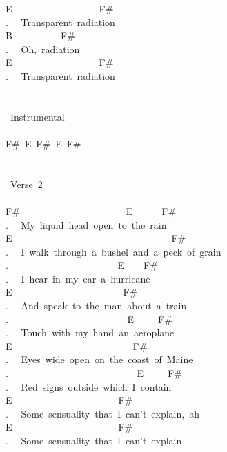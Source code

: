 {E\ \ \ \ \ \ \ \ \ \ \ \ \ \ \ \ \ \ F\#\\
. \ \ Transparent\ radiation\\
B\ \ \ \ \ \ \ \ \ \ F\#\\
. \ \ Oh,\ radiation\\
E\ \ \ \ \ \ \ \ \ \ \ \ \ \ \ \ \ \ F\#\\
. \ \ Transparent\ radiation\\
\\
\\
\lbrack\ Instrumental\rbrack\\
\\
F\#\ E\ F\#\ E\ F\#\\
\\
\\
\lbrack\ Verse\ 2\rbrack\\
\\
F\#\ \ \ \ \ \ \ \ \ \ \ \ \ \ \ \ \ \ \ \ \ \ E\ \ \ \ \ \ F\#\\
. \ \ My\ liquid\ head\ open\ to\ the\ rain\\
E\ \ \ \ \ \ \ \ \ \ \ \ \ \ \ \ \ \ \ \ \ \ \ \ \ \ \ \ \ \ \ \ \ F\#\\
. \ \ I\ walk\ through\ a\ bushel\ and\ a\ peck\ of\ grain\\
. \ \ \ \ \ \ \ \ \ \ \ \ \ \ \ \ \ \ \ \ \ \ E\ \ \ \ F\#\\
. \ \ I\ hear\ in\ my\ ear\ a\ hurricane\\
E\ \ \ \ \ \ \ \ \ \ \ \ \ \ \ \ \ \ \ \ \ \ \ F\#\ \\
. \ \ And\ speak\ to\ the\ man\ about\ a\ train\\
. \ \ \ \ \ \ \ \ \ \ \ \ \ \ \ \ \ \ \ \ \ \ \ \ E\ \ \ \ \ F\#\\
. \ \ Touch\ with\ my\ hand\ an\ aeroplane\\
E\ \ \ \ \ \ \ \ \ \ \ \ \ \ \ \ \ \ \ \ \ \ \ \ \ F\#\\
. \ \ Eyes\ wide\ open\ on\ the\ coast\ of\ Maine\\
. \ \ \ \ \ \ \ \ \ \ \ \ \ \ \ \ \ \ \ \ \ \ \ \ \ \ E\ \ \ \ \ F\#\\
. \ \ Red\ signs\ outside\ which\ I\ contain\\
E\ \ \ \ \ \ \ \ \ \ \ \ \ \ \ \ \ \ \ \ \ \ F\#\ \\
. \ \ Some\ sensuality\ that\ I\ can't\ explain,\ ah\\
E\ \ \ \ \ \ \ \ \ \ \ \ \ \ \ \ \ \ \ \ \ \ F\#\ \\
. \ \ Some\ sensuality\ that\ I\ can't\ explain\\
}
